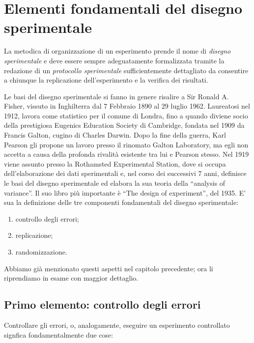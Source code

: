 \documentclass[a4paper,12pt,oneside]{book}
\providecommand{\tightlist}{%
  \setlength{\itemsep}{0pt}\setlength{\parskip}{0pt}}
\theoremstyle{definition}
\theoremstyle{definition}
\theoremstyle{definition}
\theoremstyle{remark}
\begin{document}
\section{Elementi fondamentali del disegno
sperimentale}\label{elementi-fondamentali-del-disegno-sperimentale}

La metodica di organizzazione di un esperimento prende il nome di
\emph{disegno sperimentale} e deve essere sempre adeguatamente
formalizzata tramite la redazione di un \emph{protocollo sperimentale}
sufficientemente dettagliato da consentire a chiunque la replicazione
dell'esperimento e la verifica dei risultati.

Le basi del disegno sperimentale si fanno in genere risalire a Sir
Ronald A. Fisher, vissuto in Inghilterra dal 7 Febbraio 1890 al 29
luglio 1962. Laureatosi nel 1912, lavora come statistico per il comune
di Londra, fino a quando diviene socio della prestigiosa Eugenics
Education Society di Cambridge, fondata nel 1909 da Francis Galton,
cugino di Charles Darwin. Dopo la fine della guerra, Karl Pearson gli
propone un lavoro presso il rinomato Galton Laboratory, ma egli non
accetta a causa della profonda rivalità esistente tra lui e Pearson
stesso. Nel 1919 viene assunto presso la Rothamsted Experimental
Station, dove si occupa dell'elaborazione dei dati sperimentali e, nel
corso dei successivi 7 anni, definisce le basi del disegno sperimentale
ed elabora la sua teoria della ``analysis of variance''. Il suo libro
più importante è ``The design of experiment'', del 1935. E' sua la
definizione delle tre componenti fondamentali del disegno sperimentale:

\begin{enumerate}
\def\labelenumi{\arabic{enumi}.}
\tightlist
\item
  controllo degli errori;
\item
  replicazione;
\item
  randomizzazione.
\end{enumerate}

Abbiamo già menzionato questi aspetti nel capitolo precedente; ora li
riprendiamo in esame con maggior dettaglio.

\subsection{Primo elemento: controllo degli
errori}\label{primo-elemento-controllo-degli-errori}

Controllare gli errori, o, analogamente, eseguire un esperimento
controllato signfica fondamentalmente due cose:
\end{document}
